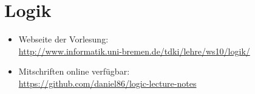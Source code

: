 \documentclass[10pt,a4paper]{article}
\begin{document}
\section*{Logik}

\begin{itemize}
  \item Webseite der Vorlesung:\\
  \url{http://www.informatik.uni-bremen.de/tdki/lehre/ws10/logik/}
  \item Mitschriften online verfügbar:\\
  \url{https://github.com/daniel86/logic-lecture-notes}
\end{itemize}














\end{document}
